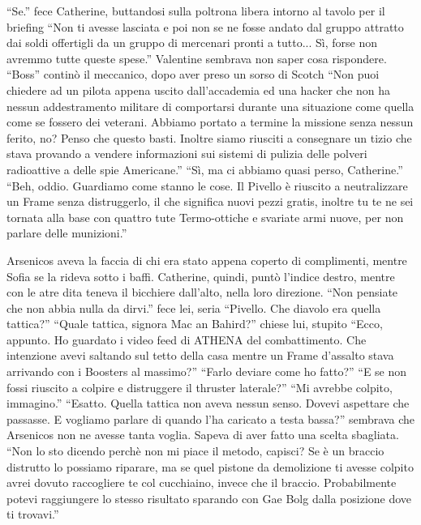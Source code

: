     ``Se.'' fece Catherine, buttandosi sulla poltrona libera intorno al tavolo per il briefing ``Non ti avesse lasciata
    e poi non se ne fosse andato dal gruppo attratto dai soldi offertigli da un gruppo di mercenari pronti a tutto...
    Sì, forse non avremmo tutte queste spese.'' Valentine sembrava non saper cosa rispondere. ``Boss'' continò il
    meccanico, dopo aver preso un sorso di Scotch ``Non puoi chiedere ad un pilota appena uscito dall'accademia ed una
    hacker che non ha nessun addestramento militare di comportarsi durante una situazione come quella come se fossero
    dei veterani. Abbiamo portato a termine la missione senza nessun ferito, no? Penso che questo basti. Inoltre siamo
    riusciti a consegnare un tizio che stava provando a vendere informazioni sui sistemi di pulizia delle polveri
    radioattive a delle spie Americane.'' ``Sì, ma ci abbiamo quasi perso, Catherine.'' ``Beh, oddio. Guardiamo come
    stanno le cose. Il Pivello è riuscito a neutralizzare un Frame senza distruggerlo, il che significa nuovi pezzi
    gratis, inoltre tu te ne sei tornata alla base con quattro tute Termo-ottiche e svariate armi nuove, per non parlare
    delle munizioni.''

    Arsenicos aveva la faccia di chi era stato appena coperto di complimenti, mentre Sofia se la rideva sotto i baffi.
    Catherine, quindi, puntò l'indice destro, mentre con le atre dita teneva il bicchiere dall'alto, nella loro
    direzione. ``Non pensiate che non abbia nulla da dirvi.'' fece lei, seria ``Pivello. Che diavolo era quella
    tattica?'' ``Quale tattica, signora Mac an Bahird?'' chiese lui, stupito ``Ecco, appunto. Ho guardato i video feed
    di ATHENA del combattimento. Che intenzione avevi saltando sul tetto della casa mentre un Frame d'assalto stava
    arrivando con i Boosters al massimo?'' ``Farlo deviare come ho fatto?'' ``E se non fossi riuscito a colpire e
    distruggere il thruster laterale?'' ``Mi avrebbe colpito, immagino.'' ``Esatto. Quella tattica non aveva nessun
    senso. Dovevi aspettare che passasse. E vogliamo parlare di quando l'ha caricato a testa bassa?'' sembrava che
    Arsenicos non ne avesse tanta voglia. Sapeva di aver fatto una scelta sbagliata. ``Non lo sto dicendo perchè non mi
    piace il metodo, capisci? Se è un braccio distrutto lo possiamo riparare, ma se quel pistone da demolizione ti
    avesse colpito avrei dovuto raccogliere te col cucchiaino, invece che il braccio. Probabilmente potevi raggiungere
    lo stesso risultato sparando con Gae Bolg dalla posizione dove ti trovavi.''

